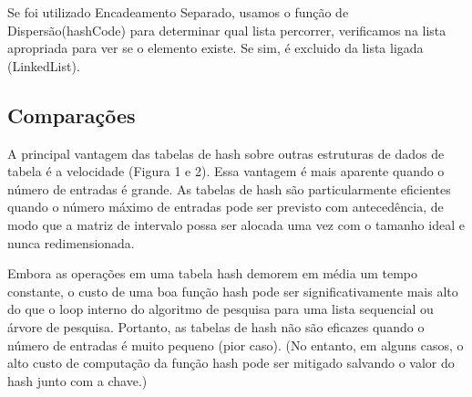 \documentclass[a4paper, 12pt]{article}
\begin{document}
Se foi utilizado Encadeamento Separado, usamos o função de Dispersão(hashCode) para determinar qual lista percorrer, verificamos na lista apropriada para ver se o elemento existe. Se sim, é excluido da lista ligada (LinkedList).
	

\subsection{Comparações}

A principal vantagem das tabelas de hash sobre outras estruturas de dados de tabela é a velocidade (Figura 1 e 2). Essa vantagem é mais aparente quando o número de entradas é grande. As tabelas de hash são particularmente eficientes quando o número máximo de entradas pode ser previsto com antecedência, de modo que a matriz de intervalo possa ser alocada uma vez com o tamanho ideal e nunca redimensionada.

Embora as operações em uma tabela hash demorem em média um tempo constante, o custo de uma boa função hash pode ser significativamente mais alto do que o loop interno do algoritmo de pesquisa para uma lista sequencial ou árvore de pesquisa. Portanto, as tabelas de hash não são eficazes quando o número de entradas é muito pequeno (pior caso). (No entanto, em alguns casos, o alto custo de computação da função hash pode ser mitigado salvando o valor do hash junto com a chave.)
\end{document}
